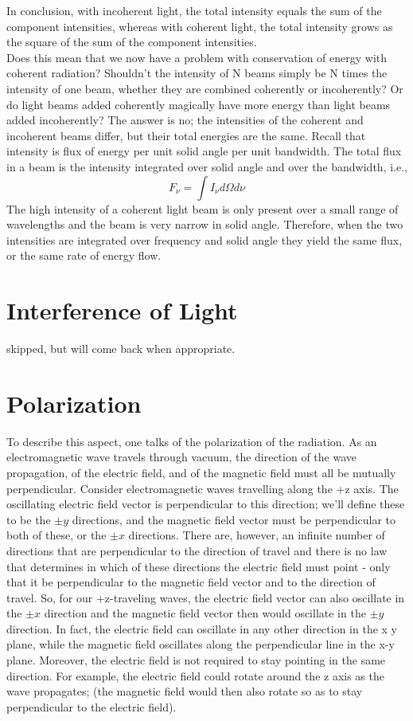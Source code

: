 \documentclass[10pt]{report}
\begin{document}
 In conclusion, with incoherent light, the total intensity equals the sum of the component intensities, whereas with coherent light, the total intensity grows as the square of the sum of the component intensities. \\
 Does this mean that we now have a problem with conservation of energy with coherent radiation?  Shouldn't the intensity of N beams simply be N times the intensity of one beam, whether they are combined coherently or incoherently?  Or do light beams added coherently magically have more energy than light beams added incoherently?  The answer is no; the intensities of the coherent and incoherent beams differ, but their total energies are the same.  Recall that intensity is flux of energy per unit solid angle per unit bandwidth.  The total flux in a beam is the intensity integrated over solid angle and over the bandwidth, i.e., 
 \begin{equation}
 F_\nu=\int I_\nu d\Omega d\nu
 \end{equation}
 The high intensity of a coherent light beam is only present over a small range of wavelengths and the beam is very narrow in solid angle.  Therefore, when the two intensities are integrated over frequency and solid angle they yield the same flux, or the same rate of energy flow.  
 
\section{Interference of Light}
skipped, but will come back when appropriate.
\section{Polarization}
 To describe this aspect, one talks of the polarization of the radiation. As an electromagnetic wave travels through vacuum, the direction of the wave propagation, of the electric field, and of the magnetic field must all be mutually perpendicular.  Consider electromagnetic waves travelling along the +z axis.  The oscillating electric field vector is perpendicular to this direction; we'll define these to be the $\pm y$ directions, and the magnetic field vector must be perpendicular to both of these, or the $\pm x$ directions. There are, however, an infinite number of directions that are perpendicular to the direction of travel and there is no law that determines in which of these directions the electric field must point - only that it be perpendicular to the magnetic field vector and to the direction of travel.  So, for our +z-traveling waves, the electric field vector can also oscillate in the $\pm x$ direction and the magnetic field vector then would oscillate in the $\pm y$ direction.  In fact, the electric field can oscillate in any other direction in the x y plane, while the magnetic field oscillates along the perpendicular line in the x-y plane.  Moreover, the electric field is not required to stay pointing in the same direction.  For example, the electric field could rotate around the z axis as the wave propagates; (the magnetic field would then also rotate so as to stay perpendicular to the electric field). \\
 
\end{document}
